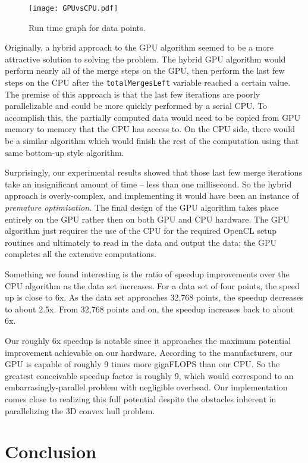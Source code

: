 \documentclass{article}
\begin{document}
\begin{figure}
\centering
\texttt{[image: GPUvsCPU.pdf]}
\caption{Run time graph for  data points.}
\label{graph_figure}
\end{figure}

Originally, a hybrid approach to the GPU algorithm seemed to be a more attractive solution to solving the problem. The hybrid GPU algorithm would perform nearly all of the merge steps on the GPU, then perform the last few steps on the CPU after the \texttt{totalMergesLeft} variable reached a certain value. The premise of this approach is that the last few iterations are poorly parallelizable and could be more quickly performed by a serial CPU. To accomplish this, the partially computed data would need to be copied from GPU memory to memory that the CPU has access to. On the CPU side, there would be a similar algorithm which would finish the rest of the computation using that same bottom-up style algorithm.

Surprisingly, our experimental results showed that those last few merge iterations take an insignificant amount of time -- less than one millisecond. So the hybrid approach is overly-complex, and implementing it would have been an instance of \emph{premature optimization.} The final design of the GPU algorithm takes place entirely on the GPU rather then on both GPU and CPU hardware. The GPU algorithm just requires the use of the CPU for the required OpenCL setup routines and ultimately to read in the data and output the data; the GPU completes all the extensive computations. 

Something we found interesting is the ratio of speedup improvements over the CPU algorithm as the data set increases. For a data set of four points, the speed up is close to 6x. As the data set approaches 32,768 points, the speedup decreases to about 2.5x. From 32,768 points and on, the speedup increases back to about 6x.

Our roughly 6x speedup is notable since it approaches the maximum potential improvement achievable on our hardware. According to the manufacturers, our GPU is capable of roughly 9 times more gigaFLOPS than our CPU. So the greatest conceivable speedup factor is roughly 9, which would correspond to an embarrasingly-parallel problem with negligible overhead. Our implementation comes close to realizing this full potential despite the obstacles inherent in parallelizing the 3D convex hull problem.

\section{Conclusion}
\end{document}
